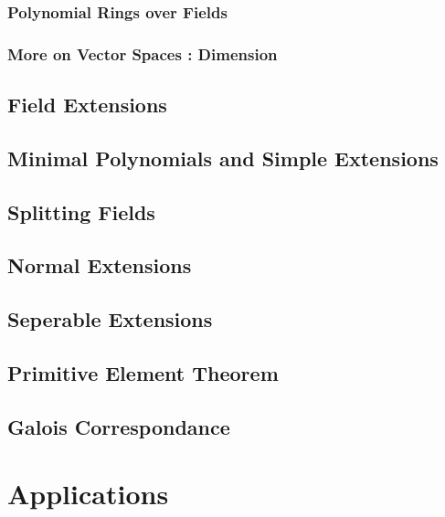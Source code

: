 \documentclass[oneside]{book}
\theoremstyle{lemmastyle}
\theoremstyle{definitionstyle}
\theoremstyle{exercisestyle}
\theoremstyle{claimstyle}
\newcommand{\<}{\langle}
\renewcommand{\>}{\rangle}
\begin{document}
        \section{Polynomial Rings over Fields}
            
        
        \section{More on Vector Spaces : Dimension}
            

    \chapter{Field Extensions}
        

    \chapter{Minimal Polynomials and Simple Extensions}
        

    \chapter{Splitting Fields}
        

    \chapter{Normal Extensions}
        

    \chapter{Seperable Extensions}
        
        
    \chapter{Primitive Element Theorem}
        

    \chapter{Galois Correspondance}
        
        
\part{Applications}
    
\end{document}
